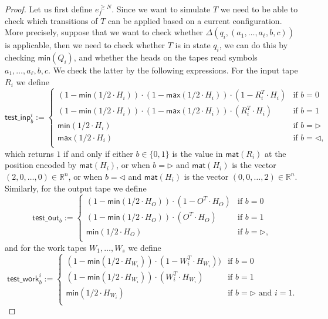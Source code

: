 \begin{proof}
    Let us first define $e_f^{\geq N}$. Since we want to simulate $T$ we need to be able to check which 
    transitions of $T$ can be applied based on a current configuration. More precisely,
    suppose that we want to check whether $\Delta(q_i,(a_1,\ldots,a_{\ell},b,c))$ is applicable, then we 
    need to check whether $T$ is in state $q_i$, we can do this by checking 
    $\mathsf{min}(Q_i)$, and whether the heads on the tapes read symbols $a_1,\ldots,a_{\ell},b,c$. We 
    check the latter by the following expressions.
    For the input tape $R_i$ we define
    $$
    \mathsf{test\_inp}^i_b:=\begin{cases}
    (1-\mathsf{min}(1/2\cdot H_i))\cdot (1-\mathsf{max}(1/2\cdot H_i))\cdot(1- R_i^T\cdot H_i) & \text{if $b=0$}\\
    (1-\mathsf{min}(1/2\cdot H_i))\cdot(1-\mathsf{max}(1/2\cdot H_i))\cdot(R_i^T\cdot H_i) & \text{if $b=1$}\\
    \mathsf{min}(1/2\cdot H_i) & \text{if $b=\rhd$}\\
    \mathsf{max}(1/2\cdot H_i) & \text{if $b=\lhd$},\\
    \end{cases}
    $$
    which returns $1$ if and only if either $b\in\{0,1\}$ is the value in $\mathsf{mat}(R_i)$ at the 
    position encoded by $\mathsf{mat}(H_i)$, or when $b=\rhd$ and $\mathsf{mat}(H_i)$ is the vector 
    $(2,0,\ldots,0)\in\mathbb{R}^n$, or when $b=\lhd$ and $\mathsf{mat}(H_i)$ is the vector 
    $(0,0,\ldots,2)\in\mathbb{R}^n$. Similarly, for the output tape we define
    $$
    \mathsf{test\_out}_b:=\begin{cases}
    (1-\mathsf{min}(1/2\cdot H_O))\cdot(1- O^T\cdot H_O) & \text{if $b=0$}\\
    (1-\mathsf{min}(1/2\cdot H_O))\cdot(O^T\cdot H_O) & \text{if $b=1$}\\
    \mathsf{min}(1/2\cdot H_O) & \text{if $b=\rhd$},\\
    \end{cases}
    $$
    and for the work tapes $W_1,\ldots,W_s$ we define
    $$
    \mathsf{test\_work}^i_b:=\begin{cases}
    (1-\mathsf{min}(1/2\cdot H_{W_i}))\cdot(1- W_i^T\cdot H_{W_i})) & \text{if $b=0$}\\
    (1-\mathsf{min}(1/2\cdot H_{W_i}))\cdot (W_i^T\cdot H_{W_i}) & \text{if $b=1$}\\
    \mathsf{min}(1/2\cdot H_{W_i}) & \text{if $b=\rhd$ and $i=1$}.\\
    \end{cases}
$$
\end{proof}
